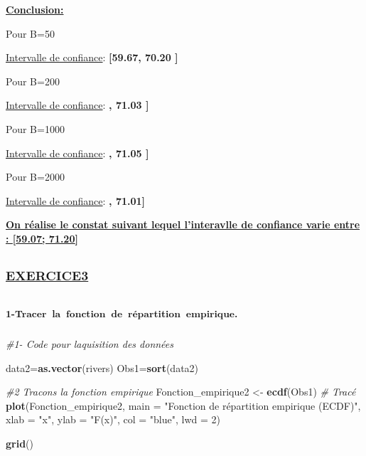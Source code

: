 \documentclass[
]{article}
\newenvironment{Shaded}{\begin{snugshade}}{\end{snugshade}}
\newcommand{\AttributeTok}[1]{\textcolor[rgb]{0.13,0.29,0.53}{#1}}
\newcommand{\CommentTok}[1]{\textcolor[rgb]{0.56,0.35,0.01}{\textit{#1}}}
\newcommand{\DecValTok}[1]{\textcolor[rgb]{0.00,0.00,0.81}{#1}}
\newcommand{\FunctionTok}[1]{\textcolor[rgb]{0.13,0.29,0.53}{\textbf{#1}}}
\newcommand{\NormalTok}[1]{#1}
\newcommand{\OtherTok}[1]{\textcolor[rgb]{0.56,0.35,0.01}{#1}}
\newcommand{\StringTok}[1]{\textcolor[rgb]{0.31,0.60,0.02}{#1}}
\begin{document}
\ul{\textbf{Conclusion:}}

Pour B=50

\ul{Intervalle de confiance}: \textbf{{[}59.67, 70.20 {]}}

Pour B=200

\ul{Intervalle de confiance}: \textbf{, 71.03 {]}}

Pour B=1000

\ul{Intervalle de confiance}: \textbf{, 71.05 {]}}

Pour B=2000

\ul{Intervalle de confiance}: \textbf{, 71.01{]}}

\ul{\textbf{On réalise le constat suivant lequel l'interavlle de
confiance varie entre : {[}59.07; 71.20{]}}}

\begin{quote}
\end{quote}

\subsection{\texorpdfstring{\textsuperscript{\ul{EXERCICE3}}}{EXERCICE3}}\label{exercice3}

\subsubsection{\texorpdfstring{\textsuperscript{1-Tracer~la~fonction~de~répartition~empirique.}}{1-Tracer~la~fonction~de~répartition~empirique.}}\label{tracer-la-fonction-de-ruxe9partition-empirique.-1}

\begin{Shaded}
\begin{Highlighting}[]
\CommentTok{\#1{-} Code pour l\textquotesingle{}aquisition des données}

\NormalTok{data2}\OtherTok{=}\FunctionTok{as.vector}\NormalTok{(rivers)}
\NormalTok{Obs1}\OtherTok{=}\FunctionTok{sort}\NormalTok{(data2)}

\CommentTok{\#2 Tracons la fonction empirique}
\NormalTok{Fonction\_empirique2 }\OtherTok{\textless{}{-}} \FunctionTok{ecdf}\NormalTok{(Obs1) }
 \CommentTok{\# Tracé }
\FunctionTok{plot}\NormalTok{(Fonction\_empirique2, }\AttributeTok{main =} \StringTok{"Fonction de répartition empirique (ECDF)"}\NormalTok{, }
\AttributeTok{xlab =} \StringTok{"x"}\NormalTok{, }\AttributeTok{ylab =} \StringTok{"F(x)"}\NormalTok{, }\AttributeTok{col =} \StringTok{"blue"}\NormalTok{, }\AttributeTok{lwd =} \DecValTok{2}\NormalTok{) }

\FunctionTok{grid}\NormalTok{()}
\end{Highlighting}
\end{Shaded}
\end{document}
